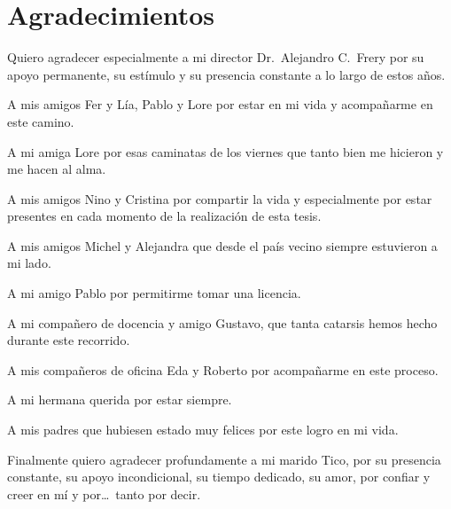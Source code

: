 
\chapter*{Agradecimientos}

Quiero agradecer especialmente a mi director Dr.\ Alejandro C.\ Frery por su apoyo permanente, su estímulo y su presencia constante a lo largo de estos años. 

A mis amigos Fer y Lía, Pablo y Lore por estar en mi vida y acompañarme en este camino.

A mi amiga Lore por esas caminatas de los viernes que tanto bien me hicieron y me hacen al alma.

A mis amigos Nino y Cristina por compartir la vida y especialmente por estar presentes en cada momento de la realización de esta tesis.

A mis amigos Michel y Alejandra que desde el país vecino siempre estuvieron a mi lado.

A mi amigo Pablo por permitirme tomar una licencia.

A mi compañero de docencia y amigo Gustavo, que tanta catarsis hemos hecho durante este recorrido.

A mis compañeros de oficina Eda y Roberto por acompañarme en este proceso. 

A mi hermana querida por estar siempre.

A mis padres que hubiesen estado muy felices por este logro en mi vida.

Finalmente quiero agradecer profundamente a mi marido Tico, por su presencia constante, su apoyo incondicional, su tiempo dedicado, su amor, por confiar y creer en mí y por\dots\ tanto por decir.